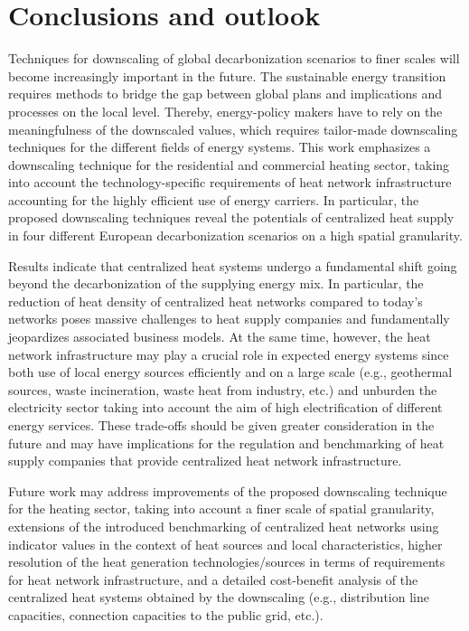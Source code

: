 \section{Conclusions and outlook}\label{conclusions}
Techniques for downscaling of global decarbonization scenarios to finer scales will become increasingly important in the future. The sustainable energy transition requires methods to bridge the gap between global plans and implications and processes on the local level. Thereby, energy-policy makers have to rely on the meaningfulness of the downscaled values, which requires tailor-made downscaling techniques for the different fields of energy systems. This work emphasizes a downscaling technique for the residential and commercial heating sector, taking into account the technology-specific requirements of heat network infrastructure accounting for the highly efficient use of energy carriers. In particular, the proposed downscaling techniques reveal the potentials of centralized heat supply in four different European decarbonization scenarios on a high spatial granularity.\newline

Results indicate that centralized heat systems undergo a fundamental shift going beyond the decarbonization of the supplying energy mix. In particular, the reduction of heat density of centralized heat networks compared to today's networks poses massive challenges to heat supply companies and fundamentally jeopardizes associated business models. At the same time, however, the heat network infrastructure may play a crucial role in expected energy systems since both use of local energy sources efficiently and on a large scale (e.g., geothermal sources, waste incineration, waste heat from industry, etc.) and unburden the electricity sector taking into account the aim of high electrification of different energy services. These trade-offs should be given greater consideration in the future and may have implications for the regulation and benchmarking of heat supply companies that provide centralized heat network infrastructure.\newline

Future work may address improvements of the proposed downscaling technique for the heating sector, taking into account a finer scale of spatial granularity, extensions of the introduced benchmarking of centralized heat networks using indicator values in the context of heat sources and local characteristics, higher resolution of the heat generation technologies/sources in terms of requirements for heat network infrastructure, and a detailed cost-benefit analysis of the centralized heat systems obtained by the downscaling (e.g., distribution line capacities, connection capacities to the public grid, etc.). 


